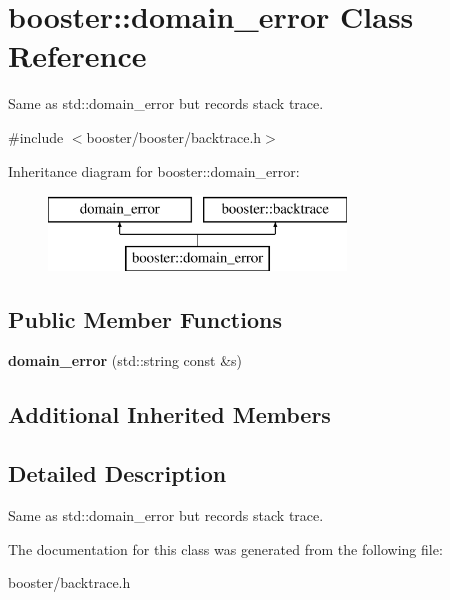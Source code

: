 \section{booster\+:\+:domain\+\_\+error Class Reference}
\label{classbooster_1_1domain__error}


Same as std\+::domain\+\_\+error but records stack trace.  




{\ttfamily \#include $<$booster/booster/backtrace.\+h$>$}

Inheritance diagram for booster\+:\+:domain\+\_\+error\+:\begin{figure}[H]
\begin{center}
\leavevmode
\includegraphics[height=2.000000cm]{classbooster_1_1domain__error}
\end{center}
\end{figure}
\subsection*{Public Member Functions}
\begin{DoxyCompactItemize}
\item 
{\bfseries domain\+\_\+error} (std\+::string const \&s)\label{classbooster_1_1domain__error_a06047ee402ac045abc0b6c3ef432ea06}

\end{DoxyCompactItemize}
\subsection*{Additional Inherited Members}


\subsection{Detailed Description}
Same as std\+::domain\+\_\+error but records stack trace. 

The documentation for this class was generated from the following file\+:\begin{DoxyCompactItemize}
\item 
booster/backtrace.\+h\end{DoxyCompactItemize}
